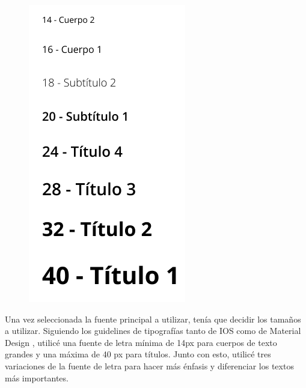 \begin{figure}
    \centering
    \includegraphics[width=0.85\linewidth]{diseno/app/presentacion/tamano.png}
\end{figure}

Una vez seleccionada la fuente principal a utilizar, tenía que decidir los tamaños a utilizar. Siguiendo los guidelines de tipografías tanto de IOS \cite{typ-ios} como de Material Design \cite{typ-android}, utilicé una fuente de letra mínima de 14px para cuerpos de texto grandes y una máxima de 40 px para títulos. Junto con esto, utilicé tres variaciones de la fuente de letra para hacer más énfasis y diferenciar los textos más importantes. 

